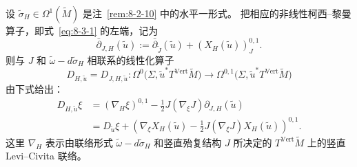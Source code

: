 \begin{remark}\label{rem:8-3-8}
设 $\widetilde\sigma_H\in\Omega^1(\widetilde M)$ 是注~\ref{rem:8-2-10} 中的水平一形式。
把相应的非线性柯西--黎曼算子，即式~\eqref{eq:8-3-1} 的左端，记为
\[
  \bar\partial_{J,H}(\widetilde u)
  :=\bar\partial_{\widetilde J}(\widetilde u)
    +(X_H(\widetilde u))^{0,1}_J.
\]
则与 $J$ 和 $\widetilde\omega-d\widetilde\sigma_H$ 相联系的线性化算子
\[
  D_{H,\widetilde u}=D_{J,H,\widetilde u}:
  \Omega^0\bigl(\Sigma,\widetilde u^*T^{\mathrm{Vert}}\widetilde M\bigr)
  \longrightarrow
  \Omega^{0,1}\bigl(\Sigma,\widetilde u^*T^{\mathrm{Vert}}\widetilde M\bigr)
\]
由下式给出：
\begin{align*}
  D_{H,\widetilde u}\xi
  &=(\nabla_H\xi)^{0,1}
    -\frac12J(\nabla_\xi J)\partial_{J,H}(\widetilde u)\\
  &=D_{\widetilde u}\xi
    +\left(\nabla_\xi X_H(\widetilde u)
      -\frac12J(\nabla_\xi J)X_H(\widetilde u)\right)^{0,1}.
\end{align*}
这里 $\nabla_H$ 表示由联络形式
$\widetilde\omega-d\widetilde\sigma_H$ 和竖直殆复结构 $J$ 所决定的
$T^{\mathrm{Vert}}\widetilde M$ 上的竖直 Levi--Civita 联络。
\end{remark}

